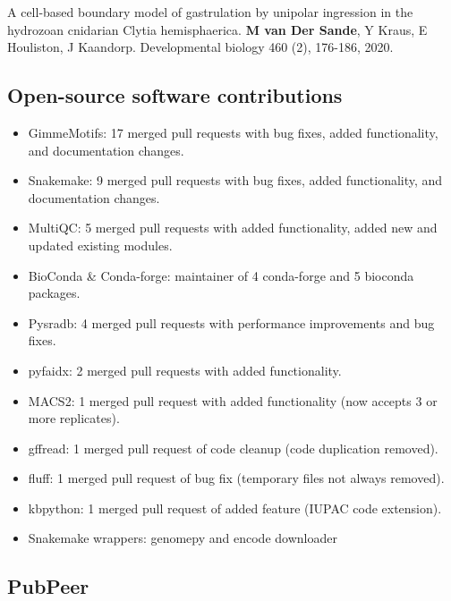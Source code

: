 \noindent
A cell-based boundary model of gastrulation by unipolar ingression in the hydrozoan cnidarian Clytia hemisphaerica. \textbf{M van Der Sande}, Y Kraus, E Houliston, J Kaandorp. Developmental biology 460 (2), 176-186, 2020. \cite{vanderSande2020}


\subsection{Open-source software contributions}

\begin{itemize}
    \item GimmeMotifs: 17 merged pull requests with bug fixes, added functionality, and documentation changes.
    \item Snakemake: 9 merged pull requests with bug fixes, added functionality, and documentation changes.
    \item MultiQC: 5 merged pull requests  with added functionality, added new and updated existing modules.
    \item BioConda \& Conda-forge:  maintainer of 4 conda-forge and 5 bioconda packages.
    \item Pysradb: 4 merged pull requests with performance improvements and bug fixes.
    \item pyfaidx: 2 merged pull requests with added functionality.
    \item MACS2: 1 merged pull request with added functionality (now accepts 3 or more replicates).
    \item gffread: 1 merged pull request of code cleanup (code duplication removed).
    \item fluff: 1 merged pull request of bug fix (temporary files not always removed).
    \item kbpython: 1 merged pull request of added feature (IUPAC code extension).
    \item Snakemake wrappers: genomepy and encode downloader
    \end{itemize}

\subsection{PubPeer}




